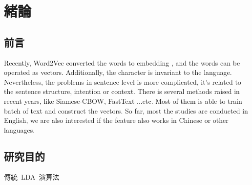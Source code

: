 \chapter{緒論}
\setlength{\baselineskip}{1.5em}
\setlength{\parindent}{2em}
\setlength{\parskip}{1em}

\section{前言}

Recently, Word2Vec converted the words to embedding , and the words can be operated as vectors. Additionally, the character is invariant to the language. Nevertheless, the problems in sentence level is more complicated, it's related to the sentence structure,  intention or context. There is several methods raised in recent years, like Siamese-CBOW, FastText ...etc. Most of them is able to train batch of text and construct the vectors. So far, most the studies are conducted in English, we are also interested if the feature also works in Chinese or other languages.

\section{研究目的}



傳統~LDA~演算法~\cite{blei2003latent}
